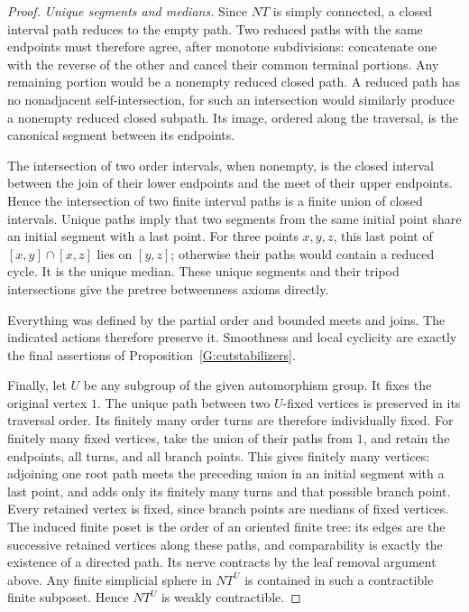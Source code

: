 \begin{proof}
\emph{Unique segments and medians.}
Since $NT$ is simply connected, a closed interval path reduces
to the empty path. Two reduced paths with the same endpoints
must therefore agree, after monotone subdivisions: concatenate
one with the reverse of the other and cancel their common
terminal portions. Any remaining portion would be a nonempty
reduced closed path. A reduced path has no nonadjacent
self-intersection, for such an intersection would similarly
produce a nonempty reduced closed subpath. Its image, ordered
along the traversal, is the canonical segment between its
endpoints.

The intersection of two order intervals, when nonempty, is the
closed interval between the join of their lower endpoints and
the meet of their upper endpoints. Hence the intersection of
two finite interval paths is a finite union of closed intervals.
Unique paths imply that two segments from the same initial point
share an initial segment with a last point. For three points
$x,y,z$, this last point of $[x,y]\cap[x,z]$ lies on $[y,z]$;
otherwise their paths would contain a reduced cycle. It is the
unique median. These unique segments and their tripod
intersections give the pretree betweenness axioms directly.

Everything was defined by the partial order and bounded meets
and joins. The indicated actions therefore preserve it.
Smoothness and local cyclicity are exactly the final assertions
of Proposition~\ref{G:cutstabilizers}.

Finally, let $U$ be any subgroup of the given automorphism group.
It fixes the original vertex $1$. The unique path between two
$U$-fixed vertices is preserved in its traversal order. Its
finitely many order turns are therefore individually fixed.
For finitely many fixed vertices, take the union of their paths
from $1$, and retain the endpoints, all turns, and all branch
points. This gives finitely many vertices: adjoining one root
path meets the preceding union in an initial segment with a last
point, and adds only its finitely many turns and that possible
branch point. Every retained vertex is fixed, since branch points
are medians of fixed vertices. The induced finite poset is the
order of an oriented finite tree: its edges are the successive
retained vertices along these paths, and comparability is exactly
the existence of a directed path. Its nerve contracts by the leaf
removal argument above. Any finite simplicial sphere in $NT^U$
is contained in such a contractible finite subposet. Hence
$NT^U$ is weakly contractible.
\end{proof}


